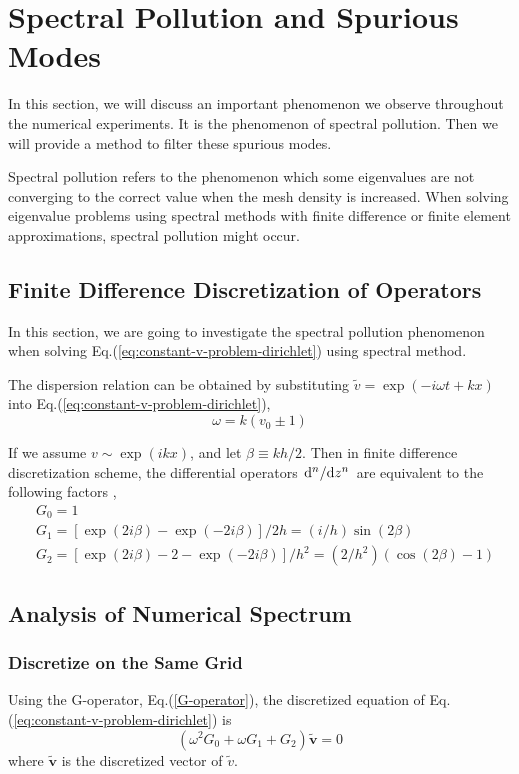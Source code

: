 \section{Spectral Pollution and Spurious Modes}
In this section, we will discuss an important phenomenon we observe throughout the numerical experiments. It is the phenomenon of spectral pollution. Then we will provide a method to filter these spurious modes.

Spectral pollution refers to the phenomenon which some eigenvalues are not converging to the correct value when the mesh density is increased. When solving eigenvalue problems using spectral methods with finite difference or finite element approximations, spectral pollution might occur. \cite{llobet_spectral_1990}

\subsection{Finite Difference Discretization of Operators}
In this section, we are going to investigate the spectral pollution phenomenon when solving Eq.(\ref{eq:constant-v-problem-dirichlet}) using spectral method.

The dispersion relation can be obtained by substituting $\tilde{v} = \exp(-i\omega t + kx)$ into Eq.(\ref{eq:constant-v-problem-dirichlet}),
\begin{equation} \label{dispersion-relation}
	\omega = k(v_0 \pm 1) 
\end{equation}

If we assume $v\sim \exp(ikx)$, and let $\beta\equiv kh/2$. Then in finite difference discretization scheme, the differential operators $\dv*[n]{z}$ are equivalent to the following factors \cite{llobet_spectral_1990},
\begin{align}
	&G_0 = 1 \nonumber \\
	&G_1 = [\exp(2i\beta)-\exp(-2i\beta)]/2h = (i/h)\sin(2\beta) 
	\label{G-operator}\\
	&G_2 = [\exp(2i\beta)-2-\exp(-2i\beta)]/h^2 = (2/h^2)(\cos(2\beta)-1) \nonumber 
\end{align}


\subsection{Analysis of Numerical Spectrum}
\subsubsection{Discretize on the Same Grid}
Using the G-operator, Eq.(\ref{G-operator}), the discretized equation of Eq.(\ref{eq:constant-v-problem-dirichlet}) is 
\begin{equation} \label{eq:discretized-eq-G}
    (\omega^2G_0 + \omega G_1 + G_2)\mathbf{\tilde{v}} = 0
\end{equation}
where $\mathbf{\tilde{v}}$ is the discretized vector of $\tilde{v}$.

